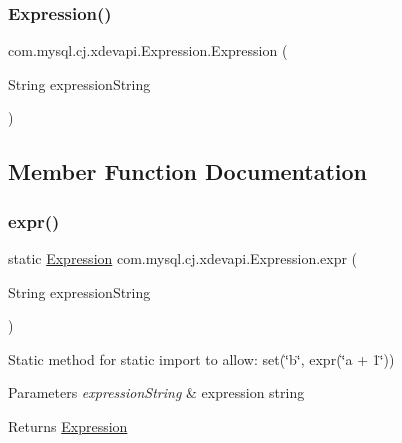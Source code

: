 \subsubsection{\texorpdfstring{Expression()}{Expression()}}
{\footnotesize\ttfamily com.\+mysql.\+cj.\+xdevapi.\+Expression.\+Expression (\begin{DoxyParamCaption}\item[{String}]{expression\+String }\end{DoxyParamCaption})}



\subsection{Member Function Documentation}
\mbox{\label{classcom_1_1mysql_1_1cj_1_1xdevapi_1_1_expression_a6e712ed08267a9450ec8012acd30a739}} 
\subsubsection{\texorpdfstring{expr()}{expr()}}
{\footnotesize\ttfamily static \mbox{\hyperlink{classcom_1_1mysql_1_1cj_1_1xdevapi_1_1_expression}{Expression}} com.\+mysql.\+cj.\+xdevapi.\+Expression.\+expr (\begin{DoxyParamCaption}\item[{String}]{expression\+String }\end{DoxyParamCaption})\hspace{0.3cm}{\ttfamily [static]}}

Static method for static import to allow\+: {\ttfamily set(\char`\"{}b\char`\"{}, expr(\char`\"{}a + 1\char`\"{}))}


\begin{DoxyParams}{Parameters}
{\em expression\+String} & expression string \\
\hline
\end{DoxyParams}
\begin{DoxyReturn}{Returns}
\mbox{\hyperlink{classcom_1_1mysql_1_1cj_1_1xdevapi_1_1_expression}{Expression}} 
\end{DoxyReturn}
\mbox{\label{classcom_1_1mysql_1_1cj_1_1xdevapi_1_1_expression_a2ca4402a9e5b44533844931a24ccda22}} 
